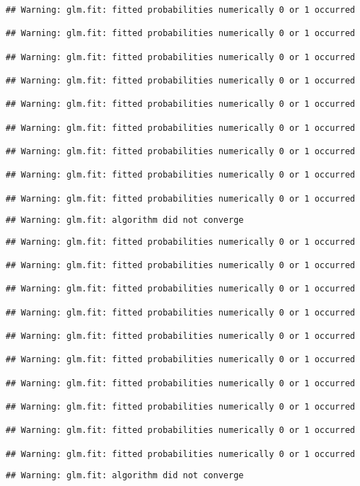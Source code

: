 \documentclass[
]{article}
\begin{document}
\begin{verbatim}
## Warning: glm.fit: fitted probabilities numerically 0 or 1 occurred

## Warning: glm.fit: fitted probabilities numerically 0 or 1 occurred

## Warning: glm.fit: fitted probabilities numerically 0 or 1 occurred

## Warning: glm.fit: fitted probabilities numerically 0 or 1 occurred

## Warning: glm.fit: fitted probabilities numerically 0 or 1 occurred

## Warning: glm.fit: fitted probabilities numerically 0 or 1 occurred

## Warning: glm.fit: fitted probabilities numerically 0 or 1 occurred

## Warning: glm.fit: fitted probabilities numerically 0 or 1 occurred

## Warning: glm.fit: fitted probabilities numerically 0 or 1 occurred
\end{verbatim}

\begin{verbatim}
## Warning: glm.fit: algorithm did not converge
\end{verbatim}

\begin{verbatim}
## Warning: glm.fit: fitted probabilities numerically 0 or 1 occurred

## Warning: glm.fit: fitted probabilities numerically 0 or 1 occurred

## Warning: glm.fit: fitted probabilities numerically 0 or 1 occurred

## Warning: glm.fit: fitted probabilities numerically 0 or 1 occurred

## Warning: glm.fit: fitted probabilities numerically 0 or 1 occurred

## Warning: glm.fit: fitted probabilities numerically 0 or 1 occurred

## Warning: glm.fit: fitted probabilities numerically 0 or 1 occurred

## Warning: glm.fit: fitted probabilities numerically 0 or 1 occurred

## Warning: glm.fit: fitted probabilities numerically 0 or 1 occurred

## Warning: glm.fit: fitted probabilities numerically 0 or 1 occurred
\end{verbatim}

\begin{verbatim}
## Warning: glm.fit: algorithm did not converge
\end{verbatim}
\end{document}
